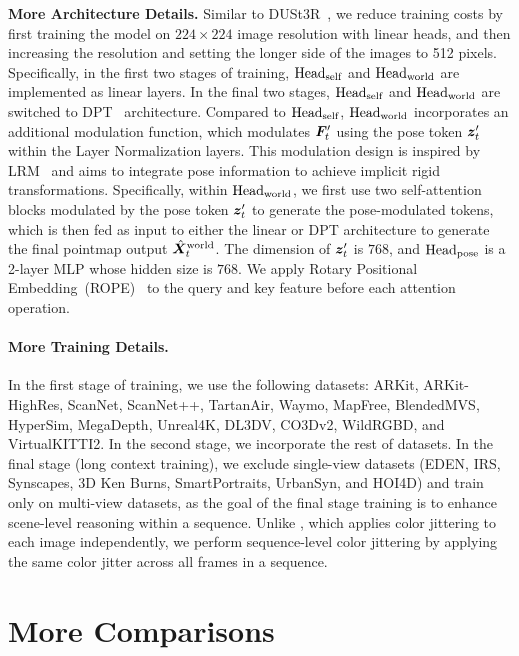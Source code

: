 \vspace{0.5em}
\noindent\textbf{More Architecture Details.} 
Similar to DUSt3R~\cite{wang2024dust3r}, we reduce training costs by first training the model on $224\times224$ image resolution with linear heads, and then increasing the resolution and setting the longer side of the images to 512 pixels. Specifically, in the first two stages of training, $\mathrm{Head}_\text{self}$ and $\mathrm{Head}_\text{world}$ are implemented as linear layers. In the final two stages, $\mathrm{Head}_\text{self}$ and $\mathrm{Head}_\text{world}$ are switched to DPT~\cite{Ranftl2021} architecture. 
Compared to $\mathrm{Head}_\text{self}$, $\mathrm{Head}_\text{world}$ incorporates an additional modulation function, which modulates $\bm{F}_t'$ using the pose token $\bm{z}_t'$ within the Layer Normalization layers. This modulation design is inspired by LRM~\cite{hong2023lrm} and aims to integrate pose information to achieve implicit rigid transformations. Specifically, within $\mathrm{Head}_\text{world}$, we first use two self-attention blocks modulated by the pose token $\bm{z}_t'$ to generate the pose-modulated tokens, which is then fed as input to either the linear or DPT architecture to generate the final pointmap output $\hat{\bm X}_t^\text{world}$. The dimension of $\bm{z}_t'$ is $768$, and $\mathrm{Head}_\text{pose}$ is a 2-layer MLP whose hidden size is $768$. We apply Rotary Positional Embedding~(ROPE)~\cite{su2024roformer} to the query and key feature before each attention operation.


\paragraph{More Training Details.}
In the first stage of training, we use the following datasets: ARKit, ARKit-HighRes, ScanNet, ScanNet++, TartanAir, Waymo, MapFree, BlendedMVS, HyperSim, MegaDepth, Unreal4K, DL3DV, CO3Dv2, WildRGBD, and VirtualKITTI2. In the second stage, we incorporate the rest of datasets. In the final stage (long context training), we exclude single-view datasets (EDEN, IRS, Synscapes, 3D Ken Burns, SmartPortraits, UrbanSyn, and HOI4D) and train only on multi-view datasets, as the goal of the final stage training is to enhance scene-level reasoning within a sequence. Unlike \duster{}, which applies color jittering to each image independently, we perform sequence-level color jittering by applying the same color jitter across all frames in a sequence.

\section{More Comparisons}

